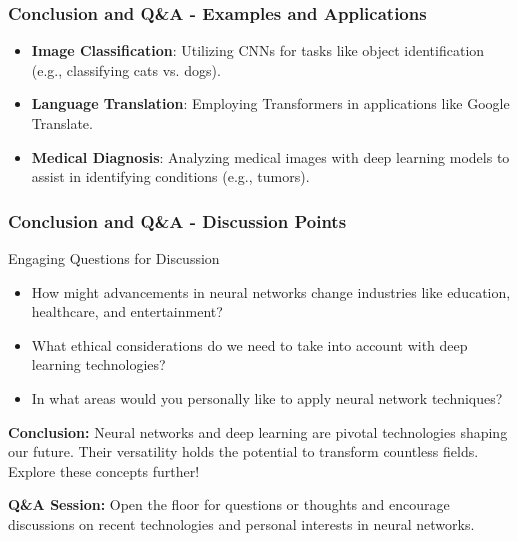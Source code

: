 \documentclass[aspectratio=169]{beamer}
\begin{document}
\begin{frame}[fragile]
    \frametitle{Conclusion and Q\&A - Examples and Applications}
    
    \begin{itemize}
        \item \textbf{Image Classification}: Utilizing CNNs for tasks like object identification (e.g., classifying cats vs. dogs).
        
        \item \textbf{Language Translation}: Employing Transformers in applications like Google Translate.
        
        \item \textbf{Medical Diagnosis}: Analyzing medical images with deep learning models to assist in identifying conditions (e.g., tumors).
    \end{itemize}
\end{frame}

\begin{frame}[fragile]
    \frametitle{Conclusion and Q\&A - Discussion Points}
    
    \begin{block}{Engaging Questions for Discussion}
        \begin{itemize}
            \item How might advancements in neural networks change industries like education, healthcare, and entertainment?
            \item What ethical considerations do we need to take into account with deep learning technologies?
            \item In what areas would you personally like to apply neural network techniques?
        \end{itemize}
    \end{block}
    
    \textbf{Conclusion:} Neural networks and deep learning are pivotal technologies shaping our future. Their versatility holds the potential to transform countless fields. Explore these concepts further!

    \textbf{Q\&A Session:} Open the floor for questions or thoughts and encourage discussions on recent technologies and personal interests in neural networks.
\end{frame}
\end{document}
